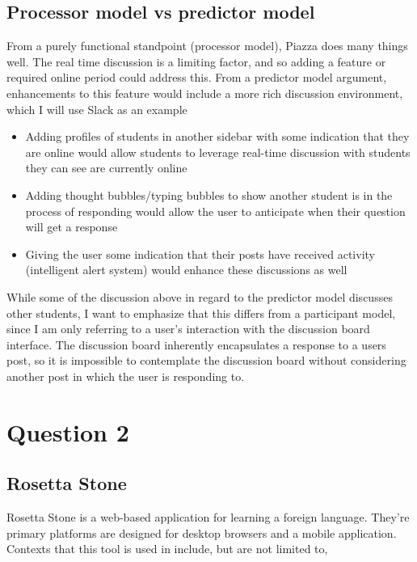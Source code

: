 \subsection{Processor model vs predictor model}

From a purely functional standpoint (processor model), Piazza does many things well. The real time discussion is a limiting factor, and so adding a feature or required online period could address this. From a predictor model argument, enhancements to this feature would include a more rich discussion environment, which I will use Slack as an example

\begin{itemize}
\item
  Adding profiles of students in another sidebar with some indication that they are online would allow students to leverage real-time discussion with students they can see are currently online
\item
  Adding thought bubbles/typing bubbles to show another student is in the process of responding would allow the user to anticipate when their question will get a response
\item
  Giving the user some indication that their posts have received activity (intelligent alert system) would enhance these discussions as well
\end{itemize}

While some of the discussion above in regard to the predictor model discusses other students, I want to emphasize that this differs from a participant model, since I am only referring to a user's interaction with the discussion board interface. The discussion board inherently encapsulates a response to a users post, so it is impossible to contemplate the discussion board without considering another post in which the user is responding to.

\section{Question 2}

\subsection{Rosetta Stone}

Rosetta Stone is a web-based application for learning a foreign language. They're primary platforms are designed for desktop browsers and a mobile application. Contexts that this tool is used in include, but are not limited to,

